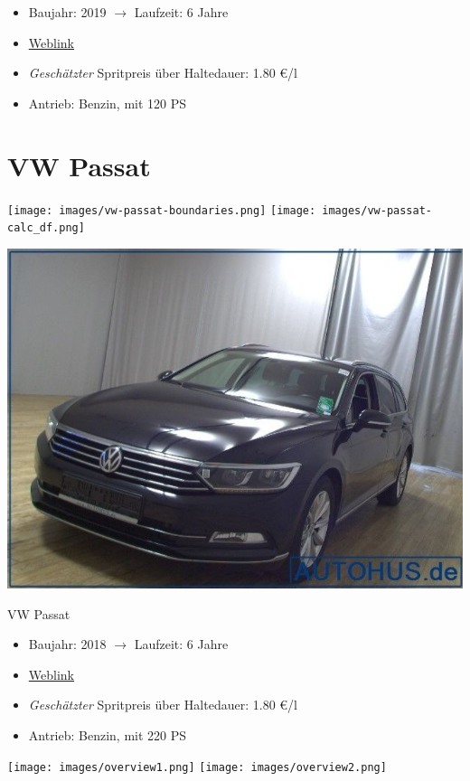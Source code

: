 \documentclass[landscape, DIV=99, 14pt]{scrartcl}
\begin{document}
\begin{itemize}
    \item Baujahr: 2019 $\rightarrow$ Laufzeit: 6 Jahre
    \item \href{https://suchen.mobile.de/fahrzeuge/details.html?id=333199596}{Weblink}
    \item \emph{Gesch\"atzter} Spritpreis \"uber Haltedauer: 1.80 \euro{}/l
    \item Antrieb: Benzin, mit 120 PS
\end{itemize}

\pagebreak


\twocolumn

\section*{VW Passat}
\begin{center}
\texttt{[image: images/vw-passat-boundaries.png]}
\null
\vspace{0.5cm}
\texttt{[image: images/vw-passat-calc\_df.png]}
\end{center}

\pagebreak
\null
\vspace{2cm}
\begin{center}
\includegraphics[width=0.9\columnwidth]{cars/vw-passat.png}

VW Passat
\end{center}

\begin{itemize}
    \item Baujahr: 2018 $\rightarrow$ Laufzeit: 6 Jahre
    \item \href{https://www.autohus.de/autosuche/details/260323/vw-passat-var-2-0-tsi/}{Weblink}
    \item \emph{Gesch\"atzter} Spritpreis \"uber Haltedauer: 1.80 \euro{}/l
    \item Antrieb: Benzin, mit 220 PS
\end{itemize}

\pagebreak



\pagebreak

\onecolumn
\null
\vfill 
\begin{center}
\texttt{[image: images/overview1.png]}
\null
\vspace{0.5cm}
\texttt{[image: images/overview2.png]}
\end{center}
\vfill 
\end{document}
